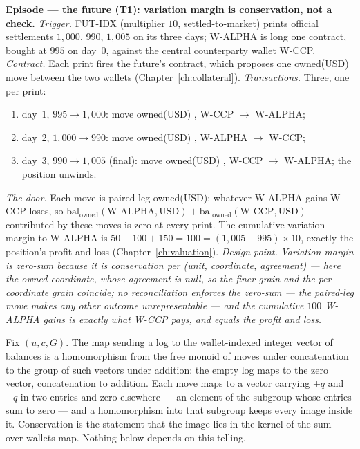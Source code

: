 \medskip\noindent\textbf{Episode --- the future (T1): variation margin is
conservation, not a check.}
\emph{Trigger.} FUT-IDX (multiplier $10$, settled-to-market) prints official
settlements $1{,}000$, $990$, $1{,}005$ on its three days; W-ALPHA is long one
contract, bought at $995$ on day~0, against the central counterparty wallet
W-CCP. \emph{Contract.} Each print fires the future's contract, which proposes one
owned(USD) move between the two wallets (Chapter~\ref{ch:collateral}).
\emph{Transactions.} Three, one per print:
\begin{enumerate}[label=(\arabic*),nosep,leftmargin=2.2em]
\item day~1, $995\!\to\!1{,}000$: move owned(USD) , W-CCP $\to$ W-ALPHA;
\item day~2, $1{,}000\!\to\!990$: move owned(USD) , W-ALPHA $\to$ W-CCP;
\item day~3, $990\!\to\!1{,}005$ (final): move owned(USD) , W-CCP $\to$
  W-ALPHA; the position unwinds.
\end{enumerate}
\emph{The door.} Each move is paired-leg owned(USD): whatever W-ALPHA gains W-CCP
loses, so $\mathrm{bal}_{\text{owned}}(\text{W-ALPHA},\text{USD}) +
\mathrm{bal}_{\text{owned}}(\text{W-CCP},\text{USD})$ contributed by these moves is
zero at every print. The cumulative variation margin to W-ALPHA is
$50-100+150 = 100 = (1{,}005-995)\times 10$, exactly the position's profit and
loss (Chapter~\ref{ch:valuation}).
\emph{Design point.} \emph{Variation margin is zero-sum because it is
conservation per (unit, coordinate, agreement) --- here the owned coordinate, whose
agreement is null, so the finer grain and the per-coordinate grain coincide; no
reconciliation enforces the zero-sum ---
the paired-leg move makes any other outcome unrepresentable --- and the cumulative
$100$ W-ALPHA gains is exactly what W-CCP pays, and equals the profit and loss.}

\begin{secondtelling}
Fix $(u,c,G)$. The map sending a log to the wallet-indexed integer vector of
balances is a homomorphism from the free monoid of moves under concatenation to
the group of such vectors under addition: the empty log maps to the zero vector,
concatenation to addition. Each move maps to a vector carrying $+q$ and $-q$ in
two entries and zero elsewhere --- an element of the subgroup whose entries sum to
zero --- and a homomorphism into that subgroup keeps every image inside it.
Conservation is the statement that the image lies in the kernel of the
sum-over-wallets map. Nothing below depends on this telling.
\end{secondtelling}

